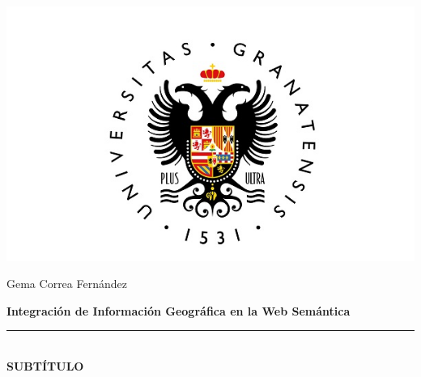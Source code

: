 \begin{titlepage}
 
 
\setlength{\centeroffset}{-0.5\oddsidemargin}
\addtolength{\centeroffset}{0.5\evensidemargin}
\thispagestyle{empty}

\noindent\hspace*{\centeroffset}\begin{minipage}{\textwidth}

\centering

% 

\vspace{0.15cm}

\includegraphics[scale=0.25]{imagenes/ugr_logo.jpg} 
 
\begin{center}
    Gema Correa Fernández
\end{center}

\vspace{0.5in}
 
{\LARGE\bfseries Integración de Información Geográfica en la Web Semántica\\
}
\noindent\rule[-1ex]{\textwidth}{0.5pt}\\[3.5ex]
{\Large\bfseries SUBTÍTULO\\[4cm]}
\end{minipage}

\vspace{4.75cm}
\noindent\hspace*{\centeroffset}\begin{minipage}{\textwidth}
\centering


\end{minipage}
\end{titlepage}
